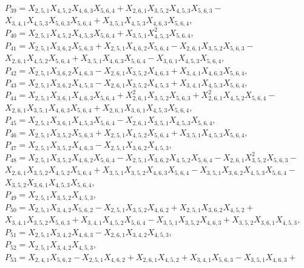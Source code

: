\documentclass[10pt]{beamer}
\begin{document}
{$P_{39}=X_{2,5,1}X_{4,5,2}X_{4,6,3}X_{5,6,4}+X_{2,6,1}X_{3,5,2}X_{4,5,3}X_{5,6,3}-$\\
$X_{3,4,1}X_{4,5,3}X_{5,6,3}X_{5,6,4}+X_{3,5,1}X_{4,5,3}X_{4,6,3}X_{5,6,4},$\\
$P_{40}=X_{2,5,1}X_{4,5,2}X_{4,5,3}X_{5,6,4}+X_{3,5,1}X_{4,5,3}^2X_{5,6,4},$\\
$P_{41}=X_{2,5,1}X_{3,6,2}X_{5,6,3}+X_{2,5,1}X_{4,6,2}X_{5,6,4}-X_{2,6,1}X_{3,5,2}X_{5,6,3}-$\\
$X_{2,6,1}X_{4,5,2}X_{5,6,4}+X_{3,5,1}X_{4,6,3}X_{5,6,4}-X_{3,6,1}X_{4,5,3}X_{5,6,4},$\\
$P_{42}=X_{2,5,1}X_{3,6,2}X_{4,6,3}-X_{2,6,1}X_{3,5,2}X_{4,6,3}+X_{3,4,1}X_{4,6,3}X_{5,6,4},$\\
$P_{43}=X_{2,5,1}X_{3,6,2}X_{4,5,3}-X_{2,6,1}X_{3,5,2}X_{4,5,3}+X_{3,4,1}X_{4,5,3}X_{5,6,4},$\\
$P_{44}=X_{2,5,1}X_{3,6,1}X_{4,6,3}X_{5,6,4}+X_{2,6,1}^2X_{3,5,2}X_{5,6,3}+X_{2,6,1}^2X_{4,5,2}X_{5,6,4}-$\\
$X_{2,6,1}X_{3,5,1}X_{4,6,3}X_{5,6,4}+X_{2,6,1}X_{3,6,1}X_{4,5,3}X_{5,6,4},$\\
$P_{45}=X_{2,5,1}X_{3,6,1}X_{4,5,3}X_{5,6,4}-X_{2,6,1}X_{3,5,1}X_{4,5,3}X_{5,6,4},$\\
$P_{46}=X_{2,5,1}X_{3,5,2}X_{5,6,3}+X_{2,5,1}X_{4,5,2}X_{5,6,4}+X_{3,5,1}X_{4,5,3}X_{5,6,4},$\\
$P_{47}=X_{2,5,1}X_{3,5,2}X_{4,6,3}-X_{2,5,1}X_{3,6,2}X_{4,5,3},$\\
$P_{48}=X_{2,5,1}X_{3,5,2}X_{4,6,2}X_{5,6,4}-X_{2,5,1}X_{3,6,2}X_{4,5,2}X_{5,6,4}-X_{2,6,1}X_{3,5,2}^2X_{5,6,3}-$\\
$X_{2,6,1}X_{3,5,2}X_{4,5,2}X_{5,6,4}+X_{3,5,1}X_{3,5,2}X_{4,6,3}X_{5,6,4}-X_{3,5,1}X_{3,6,2}X_{4,5,3}X_{5,6,4}-$\\
$X_{3,5,2}X_{3,6,1}X_{4,5,3}X_{5,6,4},$\\
$P_{49}=X_{2,5,1}X_{3,5,2}X_{4,5,3},$\\
$P_{50}=X_{2,5,1}X_{3,4,2}X_{5,6,2}-X_{2,5,1}X_{3,5,2}X_{4,6,2}+X_{2,5,1}X_{3,6,2}X_{4,5,2}+$\\
$X_{3,4,1}X_{3,5,2}X_{5,6,3}+X_{3,4,1}X_{4,5,2}X_{5,6,4}-X_{3,5,1}X_{3,5,2}X_{4,6,3}+X_{3,5,2}X_{3,6,1}X_{4,5,3},$\\
$P_{51}=X_{2,5,1}X_{3,4,2}X_{4,6,3}-X_{2,6,1}X_{3,4,2}X_{4,5,3},$\\
$P_{52}=X_{2,5,1}X_{3,4,2}X_{4,5,3},$\\
$P_{53}=X_{2,4,1}X_{5,6,2}-X_{2,5,1}X_{4,6,2}+X_{2,6,1}X_{4,5,2}+X_{3,4,1}X_{5,6,3}-X_{3,5,1}X_{4,6,3}+$\\
}
\end{document}
